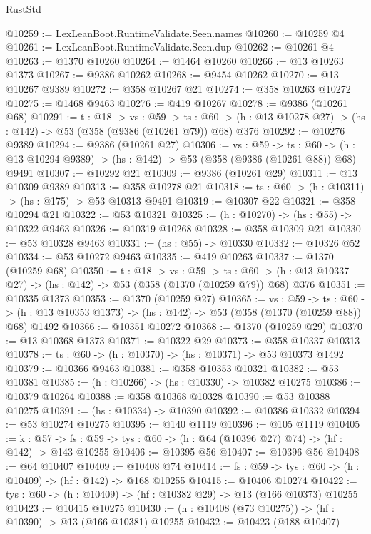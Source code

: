 \begin{lexlean}{RustStd}
\begin{coremodule}
@10259 := LexLeanBoot.RuntimeValidate.Seen.names
@10260 := @10259 @4
@10261 := LexLeanBoot.RuntimeValidate.Seen.dup
@10262 := @10261 @4
@10263 := @1370 @10260
@10264 := @1464 @10260
@10266 := @13 @10263 @1373
@10267 := @9386 @10262
@10268 := @9454 @10262
@10270 := @13 @10267 @9389
@10272 := @358 @10267 @21
@10274 := @358 @10263 @10272
@10275 := @1468 @9463
@10276 := @419 @10267
@10278 := @9386 (@10261 @68)
@10291 := {t : @18} ->
  {vs : @59} ->
  {ts : @60} -> (h : @13 @10278 @27) -> (hs : @142) -> @53 (@358 (@9386 (@10261 @79)) @68) @376
@10292 := @10276 @9389
@10294 := @9386 (@10261 @27)
@10306 := {vs : @59} ->
  {ts : @60} -> (h : @13 @10294 @9389) -> (hs : @142) -> @53 (@358 (@9386 (@10261 @88)) @68) @9491
@10307 := @10292 @21
@10309 := @9386 (@10261 @29)
@10311 := @13 @10309 @9389
@10313 := @358 @10278 @21
@10318 := {ts : @60} -> (h : @10311) -> (hs : @175) -> @53 @10313 @9491
@10319 := @10307 @22
@10321 := @358 @10294 @21
@10322 := @53 @10321
@10325 := (h : @10270) -> (hs : @55) -> @10322 @9463
@10326 := @10319 @10268
@10328 := @358 @10309 @21
@10330 := @53 @10328 @9463
@10331 := (hs : @55) -> @10330
@10332 := @10326 @52
@10334 := @53 @10272 @9463
@10335 := @419 @10263
@10337 := @1370 (@10259 @68)
@10350 := {t : @18} ->
  {vs : @59} ->
  {ts : @60} -> (h : @13 @10337 @27) -> (hs : @142) -> @53 (@358 (@1370 (@10259 @79)) @68) @376
@10351 := @10335 @1373
@10353 := @1370 (@10259 @27)
@10365 := {vs : @59} ->
  {ts : @60} -> (h : @13 @10353 @1373) -> (hs : @142) -> @53 (@358 (@1370 (@10259 @88)) @68) @1492
@10366 := @10351 @10272
@10368 := @1370 (@10259 @29)
@10370 := @13 @10368 @1373
@10371 := @10322 @29
@10373 := @358 @10337 @10313
@10378 := {ts : @60} -> (h : @10370) -> (hs : @10371) -> @53 @10373 @1492
@10379 := @10366 @9463
@10381 := @358 @10353 @10321
@10382 := @53 @10381
@10385 := (h : @10266) -> (hs : @10330) -> @10382 @10275
@10386 := @10379 @10264
@10388 := @358 @10368 @10328
@10390 := @53 @10388 @10275
@10391 := (hs : @10334) -> @10390
@10392 := @10386 @10332
@10394 := @53 @10274 @10275
@10395 := @140 @1119
@10396 := @105 @1119
@10405 := {k : @57} ->
  {fs : @59} -> {tys : @60} -> (h : @64 (@10396 @27) @74) -> (hf : @142) -> @143 @10255
@10406 := @10395 @56
@10407 := @10396 @56
@10408 := @64 @10407
@10409 := @10408 @74
@10414 := {fs : @59} -> {tys : @60} -> (h : @10409) -> (hf : @142) -> @168 @10255
@10415 := @10406 @10274
@10422 := {tys : @60} -> (h : @10409) -> (hf : @10382 @29) -> @13 (@166 @10373) @10255
@10423 := @10415 @10275
@10430 := (h : @10408 (@73 @10275)) -> (hf : @10390) -> @13 (@166 @10381) @10255
@10432 := @10423 (@188 @10407)

\end{coremodule}
\end{lexlean}
